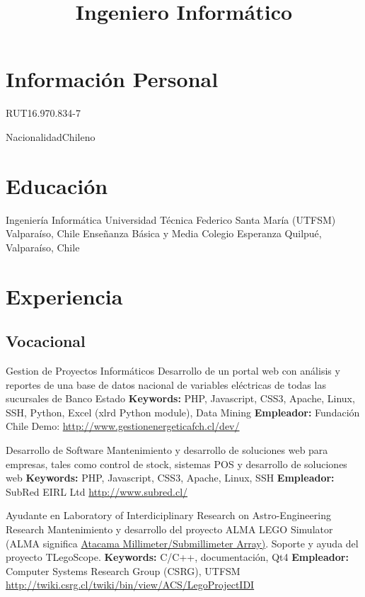 \documentclass[11pt,a4paper]{moderncv}
\title{Ingeniero Informático}
\begin{document}
\maketitle

\section{Información Personal}

	   {RUT}{16.970.834-7}

	   {Nacionalidad}{Chileno}

\section{Educación}

        {Ingeniería Informática}
        {Universidad Técnica Federico Santa María (UTFSM)}
        {Valparaíso, Chile}
        {}
        {}
        {Enseñanza Básica y Media}
        {Colegio Esperanza}
        {Quilpué, Valparaíso, Chile}
        {}{}

\section{Experiencia}
\subsection{Vocacional}

        {Gestion de Proyectos Informáticos}
        {Desarrollo de  un portal web con análisis y reportes de una base de datos nacional de variables eléctricas de todas las sucursales de Banco Estado}
        {\textbf{Keywords:} PHP, Javascript, CSS3, Apache, Linux, SSH, Python, Excel (xlrd Python module), Data Mining}
        {\textbf{Empleador:} Fundación Chile}
        {Demo: \url{http://www.gestionenergeticafch.cl/dev/}}

        {Desarrollo de Software}
        {Mantenimiento y desarrollo de soluciones web para empresas, tales como control de stock, sistemas POS y desarrollo de soluciones web}
        {\textbf{Keywords:} PHP, Javascript, CSS3, Apache, Linux, SSH}
        {\textbf{Empleador:} SubRed EIRL Ltd}
        {\url{http://www.subred.cl/}}

        {Ayudante en Laboratory of Interdiciplinary Research on Astro-Engineering Research}
        {Mantenimiento y desarrollo del proyecto ALMA LEGO Simulator (ALMA significa \href{http://www.alma.cl/}{Atacama Millimeter/Submillimeter Array)}. Soporte y ayuda del proyecto TLegoScope.}
        {\textbf{Keywords:} C/C++, documentación, Qt4}
        {\textbf{Empleador:} Computer Systems Research Group (CSRG), UTFSM}
        {\url{http://twiki.csrg.cl/twiki/bin/view/ACS/LegoProjectIDI}}
\end{document}
